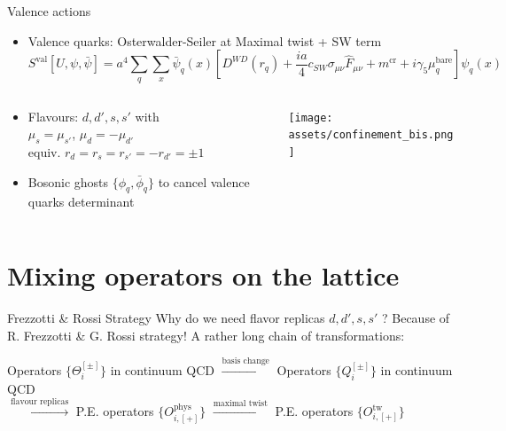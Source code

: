 \documentclass{beamer}
\begin{document}
\begin{frame}{Valence actions}
      \begin{itemize}
            \item Valence quarks: Osterwalder-Seiler at Maximal twist + SW term
            \begin{equation*}
                  S^\text{val}[U,\psi,\bar\psi] = a^4 \sum_q \sum_x \bar \psi_q (x) \left[ D^{WD}(r_q) + \frac{ia}{4}c_{SW}\sigma_{\mu\nu}\hat{F}_{\mu\nu} + m^\text{cr} + i \gamma_5 \mu_q^\text{bare} \right] \psi_q (x)
            \end{equation*}
      \end{itemize}
      \begin{columns}
            \begin{column}{0.5\textwidth}
                  \begin{itemize}
                        \item Flavours: $d,d',s,s'$ with\\ $\mu_s = \mu_{s'}$, $\mu_d=-\mu_{d'}$\\equiv. $r_d = r_s = r_{s'} = -r_{d'} = \pm 1$
                        \vspace{\baselineskip}
                        \item Bosonic ghosts $\{\phi_q, \bar \phi_q\}$ to cancel valence quarks determinant
                  \end{itemize}
            \end{column}
            \begin{column}{0.45\textwidth}
                  \texttt{[image: assets/confinement\_bis.png]}
            \end{column}
      \end{columns}
\end{frame}

\section{Mixing operators on the lattice}

\begin{frame}{Frezzotti \& Rossi Strategy}
      Why do we need flavor replicas $d,d',s,s'$ ? Because of R. Frezzotti \& G. Rossi strategy!
      \vspace{\baselineskip}
      \newline
      A rather long chain of transformations:
      \begin{center}
            Operators $\{\Theta_i^{[\pm]}\}$ in continuum QCD $\xrightarrow{ \text{basis change} }$ Operators $\{Q_i^{[\pm]}\}$ in continuum QCD\\
            \vspace{\baselineskip}
            $\xrightarrow{ \text{flavour replicas} }$ P.E. operators $\{O_{i,[+]}^\text{phys}\}$ $\xrightarrow{ \text{maximal twist} }$ P.E. operators $\{O_{i,[+]}^\text{tw}\}$
      \end{center}
\end{frame}
\end{document}
